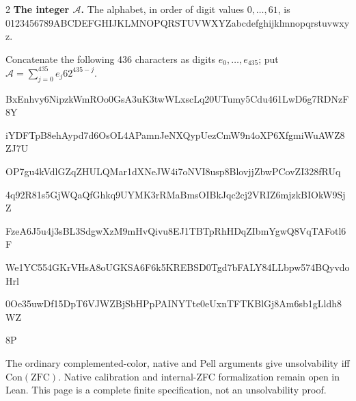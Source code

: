\documentclass[10pt]{article}
\begin{document}
\begin{multicols}{2}
\textbf{The integer $\mathcal A$.}
The alphabet, in order of digit values $0,\ldots,61$, is
{\fontsize{7.7}{8.2}\selectfont\ttfamily 0123456789ABCDEFGHIJKLMNOPQRSTUVWXYZabcdefghijklmnopqrstuvwxyz}.\par
Concatenate the following 436 characters as digits $e_0,\ldots,e_{435}$;
put $\mathcal A=\sum_{j=0}^{435}e_j62^{435-j}$.\par
\begingroup\fontsize{7.7}{8.2}\selectfont\ttfamily
BxEnhvy6NipzkWmROo0GsA3uK3twWLxscLq20UTumy5Cdu461LwD6g7RDNzF8Y\par
iYDFTpB8ehAypd7d6OsOL4APamnJeNXQypUezCmW9n4oXP6XfgmiWuAWZ8ZJ7U\par
OP7gu4kVdlGZqZHULQMar1dXNeJW4i7oNVI8usp8BlovjjZbwPCovZI328fRUq\par
4q92R81s5GjWQaQfGhkq9UYMK3rRMaBmsOIBkJqc2cj2VRIZ6mjzkBIOkW9SjZ\par
FzeA6J5u4j3sBL3SdgwXzM9mHvQivu8EJ1TBTpRhHDqZIbmYgwQ8VqTAFotl6F\par
We1YC554GKrVHsA8oUGKSA6F6k5KREBSD0Tgd7bFALY84LLbpw574BQyvdoHrl\par
0Oe35uwDf15DpT6VJWZBjSbHPpPAINYTte0eUxnTFTKBlGj8Am6sb1gLldh8WZ\par
8P\par
\endgroup
\normalfont\fontsize{7.7}{8.2}\selectfont
The ordinary complemented-color, native and Pell arguments give
unsolvability iff $\mathrm{Con}(\mathrm{ZFC})$.
Native calibration and internal-ZFC formalization remain open in Lean.
This page is a complete finite specification, not an unsolvability proof.
\end{multicols}
\end{document}
